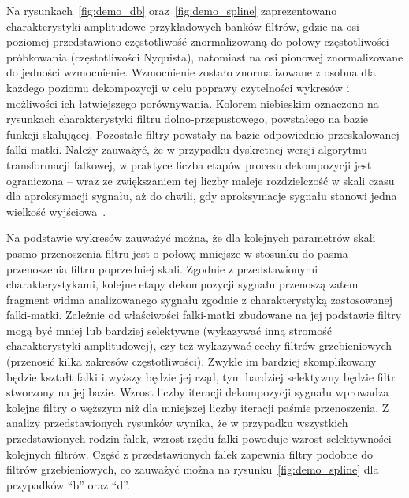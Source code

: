 Na rysunkach~\ref{fig:demo_db} oraz~\ref{fig:demo_spline} zaprezentowano charakterystyki amplitudowe przykładowych banków filtrów, gdzie na osi poziomej przedstawiono częstotliwość znormalizowaną do połowy częstotliwości próbkowania (częstotliwości Nyquista), natomiast na osi pionowej znormalizowane do jedności wzmocnienie. Wzmocnienie zostało znormalizowane z osobna dla każdego poziomu dekompozycji w celu poprawy czytelności wykresów i możliwości ich łatwiejszego porównywania. Kolorem niebieskim oznaczono na rysunkach charakterystyki filtru dolno-przepustowego, powstałego na bazie funkcji skalującej. Pozostałe filtry powstały na bazie odpowiednio przeskalowanej falki-matki. Należy zauważyć, że w przypadku dyskretnej wersji algorytmu transformacji falkowej, w praktyce liczba etapów procesu dekompozycji jest ograniczona -- wraz ze zwiększaniem tej liczby maleje rozdzielczość w skali czasu dla aproksymacji sygnału, aż do chwili, gdy aproksymacje sygnału stanowi jedna wielkość wyjściowa~\cite{wallen_handbook}.

Na podstawie wykresów zauważyć można, że dla kolejnych parametrów skali pasmo przenoszenia filtru jest o połowę mniejsze w stosunku do pasma przenoszenia filtru poprzedniej skali. Zgodnie z przedstawionymi charakterystykami, kolejne etapy dekompozycji sygnału przenoszą zatem fragment widma analizowanego sygnału zgodnie z charakterystyką zastosowanej falki-matki. Zależnie od właściwości falki-matki zbudowane na jej podstawie filtry mogą być mniej lub bardziej selektywne (wykazywać inną stromość charakterystyki amplitudowej), czy też wykazywać cechy filtrów grzebieniowych (przenosić kilka zakresów częstotliwości). Zwykle im bardziej skomplikowany będzie kształt falki i wyższy będzie jej rząd, tym bardziej selektywny będzie filtr stworzony na jej bazie. Wzrost liczby iteracji dekompozycji sygnału wprowadza kolejne filtry o węższym niż dla mniejszej liczby iteracji paśmie przenoszenia. Z analizy przedstawionych rysunków wynika, że w przypadku wszystkich przedstawionych rodzin falek, wzrost rzędu falki powoduje wzrost selektywności kolejnych filtrów. Część z przedstawionych falek zapewnia filtry podobne do filtrów grzebieniowych, co zauważyć można na rysunku~\ref{fig:demo_spline} dla przypadków \enquote{b} oraz \enquote{d}.

